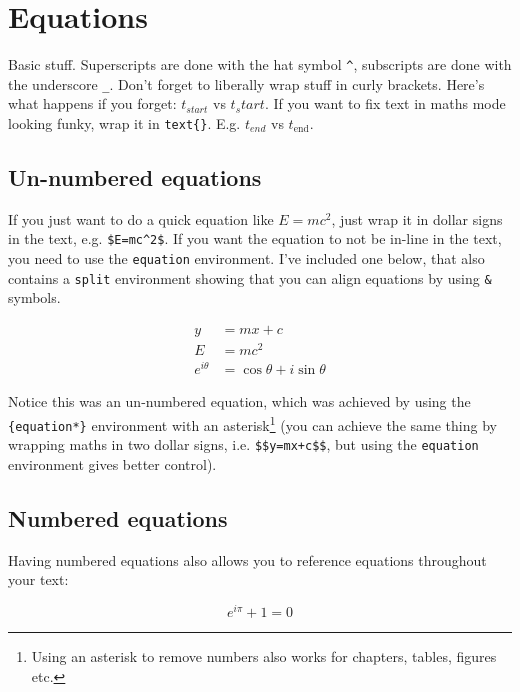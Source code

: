 \documentclass[../main]{subfiles}
\begin{document}
\section{Equations}\label{sec:equations}

Basic stuff. Superscripts are done with the hat symbol \verb|^|, subscripts are done with the underscore \verb|_|. Don't forget to liberally wrap stuff in curly brackets. Here's what happens if you forget: $ t_{start}$ vs $t_start $. If you want to fix text in maths mode looking funky, wrap it in \verb|text{}|. E.g. $t_{end}$ vs $t_\text{end}$.


\subsection{Un-numbered equations}
If you just want to do a quick equation like $E=mc^2$, just wrap it in dollar signs in the text, e.g. \verb|$E=mc^2$|. If you want the equation to not be in-line in the text, you need to use the \verb|equation| environment. I've included one below, that also contains a \verb|split| environment showing that you can align equations by using \verb|&| symbols.

\begin{equation*}
    \begin{split}
        y &= mx+c\\
        E &= mc^{2}\\
        e^{i\theta} &= \cos{\theta} + i\sin{\theta}
    \end{split}
\end{equation*}

Notice this was an un-numbered equation, which was achieved by using the \verb|{equation*}| environment with an asterisk\footnote{Using an asterisk to remove numbers also works for chapters, tables, figures etc.} (you can achieve the same thing by wrapping maths in two dollar signs, i.e. \verb|$$y=mx+c$$|, but using the \texttt{equation} environment gives better control).  

\subsection{Numbered equations}
Having numbered equations also allows you to reference equations throughout your text:

\begin{equation} \label{eq:eulers_identity}
    e^{i\pi} + 1 = 0
\end{equation}
\end{document}
